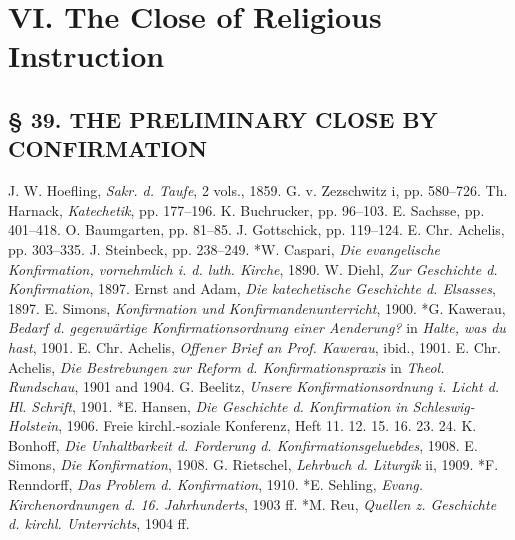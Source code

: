 \part{VI. The Close of Religious Instruction}

\chapter[§ 39. THE PRELIMINARY CLOSE]{§ 39. THE PRELIMINARY CLOSE BY CONFIRMATION}

J. W. Hoefling, \emph{Sakr. d. Taufe}, 2 vols., 1859. G. v. Zezschwitz i, pp. 580–726. Th. Harnack, \emph{Katechetik}, pp. 177–196. K. Buchrucker, pp. 96–103. E. Sachsse, pp. 401–418. O. Baumgarten, pp. 81–85. J. Gottschick, pp. 119–124. E. Chr. Achelis, pp. 303–335. J. Steinbeck, pp. 238–249. *W. Caspari, \emph{Die evangelische Konfirmation, vornehmlich i. d. luth. Kirche}, 1890. W. Diehl, \emph{Zur Geschichte d. Konfirmation}, 1897. Ernst and Adam, \emph{Die katechetische Geschichte d. Elsasses}, 1897. E. Simons, \emph{Konfirmation und Konfirmandenunterricht}, 1900. *G. Kawerau, \emph{Bedarf d. gegenwärtige Konfirmationsordnung einer Aenderung?} in \emph{Halte, was du hast}, 1901. E. Chr. Achelis, \emph{Offener Brief an Prof. Kawerau}, ibid., 1901. E. Chr. Achelis, \emph{Die Bestrebungen zur Reform d. Konfirmationspraxis} in \emph{Theol. Rundschau}, 1901 and 1904. G. Beelitz, \emph{Unsere Konfirmationsordnung i. Licht d. Hl. Schrift}, 1901. *E. Hansen, \emph{Die Geschichte d. Konfirmation in Schleswig-Holstein}, 1906. Freie kirchl.-soziale Konferenz, Heft 11. 12. 15. 16. 23. 24. K. Bonhoff, \emph{Die Unhaltbarkeit d. Forderung d. Konfirmationsgeluebdes}, 1908. E. Simons, \emph{Die Konfirmation}, 1908. G. Rietschel, \emph{Lehrbuch d. Liturgik} ii, 1909. *F. Renndorff, \emph{Das Problem d. Konfirmation}, 1910. *E. Sehling, \emph{Evang. Kirchenordnungen d. 16. Jahrhunderts}, 1903 ff. *M. Reu, \emph{Quellen z. Geschichte d. kirchl. Unterrichts}, 1904 ff.

